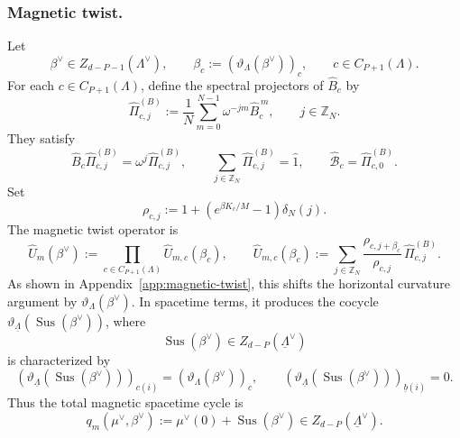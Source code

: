 \documentclass[dvipsnames,a4paper]{article}
\numberwithin{equation}{section}
\theoremstyle{definition}
\theoremstyle{remark}
\newcommand{\Sus}{\operatorname{Sus}}
\begin{document}
\subsubsection{Magnetic twist.}
Let
\begin{equation}
\beta^\vee\in Z_{d-P-1}(\Lambda^\vee),
\qquad
\beta_c:=(\vartheta_\Lambda(\beta^\vee))_c,
\qquad
c\in C_{P+1}(\Lambda).
\end{equation}
For each \(c\in C_{P+1}(\Lambda)\), define the spectral projectors of \(\hat B_c\) by
\begin{equation}
	\hat\Pi_{c,j}^{(B)}
	:=
	\frac1N\sum_{m=0}^{N-1}\omega^{-jm}\hat B_c^{\,m},
	\qquad
	j\in\mathbb Z_N.
\end{equation}
They satisfy
\begin{equation}
\hat B_c\hat\Pi_{c,j}^{(B)}
=
\omega^j\hat\Pi_{c,j}^{(B)},
\qquad
\sum_{j\in\mathbb Z_N}\hat\Pi_{c,j}^{(B)}=\hat 1,
\qquad
\hat{\mathcal B}_c=\hat\Pi_{c,0}^{(B)}.
\end{equation}
Set
\begin{equation}
	\rho_{c,j}
	:=
	1+\left(e^{\beta K_c/M}-1\right)\delta_N(j).
\end{equation}
The magnetic twist operator is
\begin{equation}
	\hat U_m(\beta^\vee)
	:=
	\prod_{c\in C_{P+1}(\Lambda)}\hat U_{m,c}(\beta_c),
	\qquad
	\hat U_{m,c}(\beta_c)
	:=
	\sum_{j\in\mathbb Z_N}
	\frac{\rho_{c,j+\beta_c}}{\rho_{c,j}}\,
	\hat\Pi_{c,j}^{(B)} .
	\label{eq:magnetic-twist-operator}
\end{equation}
As shown in Appendix~\ref{app:magnetic-twist}, this shifts the horizontal curvature
argument by \(\vartheta_\Lambda(\beta^\vee)\). In spacetime terms, it produces the cocycle
\(\vartheta_{\underline\Lambda}(\Sus(\beta^\vee))\), where
\begin{equation}
	\Sus(\beta^\vee)
	\in Z_{d-P}(\underline\Lambda^\vee)
	\label{eq:magnetic-suspension}
\end{equation}
is characterized by
\begin{equation}
	\left(\vartheta_{\underline\Lambda}(\Sus(\beta^\vee))\right)_{c(i)}
	=
	(\vartheta_\Lambda(\beta^\vee))_c,
	\qquad
	\left(\vartheta_{\underline\Lambda}(\Sus(\beta^\vee))\right)_{\underline b(i)}
	=
	0.
	\label{eq:eta-hor-beta-components}
\end{equation}
Thus the total magnetic spacetime cycle is
\begin{equation}
	q_m(\mu^\vee,\beta^\vee)
	:=
	\mu^\vee(0)+\Sus(\beta^\vee)
	\in Z_{d-P}(\underline\Lambda^\vee).
	\label{eq:qm}
\end{equation}
\end{document}
